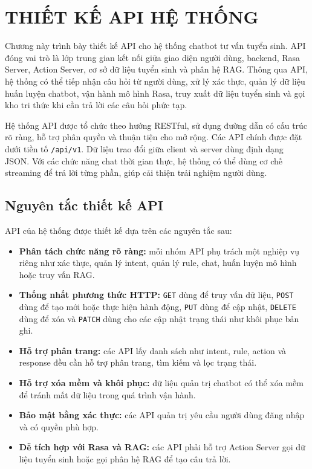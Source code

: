 ﻿\chapter{THIẾT KẾ API HỆ THỐNG}

Chương này trình bày thiết kế API cho hệ thống chatbot tư vấn tuyển sinh. API đóng vai trò là lớp trung gian kết nối giữa giao diện người dùng, backend, Rasa Server, Action Server, cơ sở dữ liệu tuyển sinh và phân hệ RAG. Thông qua API, hệ thống có thể tiếp nhận câu hỏi từ người dùng, xử lý xác thực, quản lý dữ liệu huấn luyện chatbot, vận hành mô hình Rasa, truy xuất dữ liệu tuyển sinh và gọi kho tri thức khi cần trả lời các câu hỏi phức tạp.

Hệ thống API được tổ chức theo hướng RESTful, sử dụng đường dẫn có cấu trúc rõ ràng, hỗ trợ phân quyền và thuận tiện cho mở rộng. Các API chính được đặt dưới tiền tố \texttt{/api/v1}. Dữ liệu trao đổi giữa client và server dùng định dạng JSON. Với các chức năng chat thời gian thực, hệ thống có thể dùng cơ chế streaming để trả lời từng phần, giúp cải thiện trải nghiệm người dùng.

\section{Nguyên tắc thiết kế API}

API của hệ thống được thiết kế dựa trên các nguyên tắc sau:

\begin{itemize}
    \item \textbf{Phân tách chức năng rõ ràng:} mỗi nhóm API phụ trách một nghiệp vụ riêng như xác thực, quản lý intent, quản lý rule, chat, huấn luyện mô hình hoặc truy vấn RAG.
    \item \textbf{Thống nhất phương thức HTTP:} \texttt{GET} dùng để truy vấn dữ liệu, \texttt{POST} dùng để tạo mới hoặc thực hiện hành động, \texttt{PUT} dùng để cập nhật, \texttt{DELETE} dùng để xóa và \texttt{PATCH} dùng cho các cập nhật trạng thái như khôi phục bản ghi.
    \item \textbf{Hỗ trợ phân trang:} các API lấy danh sách như intent, rule, action và response đều cần hỗ trợ phân trang, tìm kiếm và lọc trạng thái.
    \item \textbf{Hỗ trợ xóa mềm và khôi phục:} dữ liệu quản trị chatbot có thể xóa mềm để tránh mất dữ liệu trong quá trình vận hành.
    \item \textbf{Bảo mật bằng xác thực:} các API quản trị yêu cầu người dùng đăng nhập và có quyền phù hợp.
    \item \textbf{Dễ tích hợp với Rasa và RAG:} các API phải hỗ trợ Action Server gọi dữ liệu tuyển sinh hoặc gọi phân hệ RAG để tạo câu trả lời.
\end{itemize}


